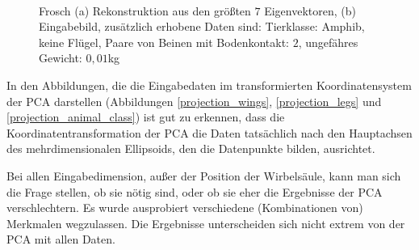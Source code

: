 \begin{figure}
  \centering
  \\
  
  \caption{Frosch (a) Rekonstruktion aus den größten $7$ Eigenvektoren, (b) Eingabebild, zusätzlich erhobene Daten sind:
  Tierklasse: Amphib, keine Flügel, Paare von Beinen mit Bodenkontakt: $2$, ungefähres Gewicht: $0,01$kg}
  \label{frosch}
 \end{figure}
 

 In den Abbildungen, die die Eingabedaten im transformierten Koordinatensystem der PCA darstellen (Abbildungen \ref{projection_wings}, \ref{projection_legs} und \ref{projection_animal_class}) ist gut zu erkennen, dass die Koordinatentransformation der PCA die Daten tatsächlich nach den Hauptachsen des mehrdimensionalen Ellipsoids, den die Datenpunkte bilden, ausrichtet.

 Bei allen Eingabedimension, außer der Position der Wirbelsäule, kann man sich die Frage stellen, ob sie nötig sind, oder ob sie eher die Ergebnisse der PCA verschlechtern. Es wurde ausprobiert verschiedene (Kombinationen von) Merkmalen wegzulassen. Die Ergebnisse unterscheiden sich nicht extrem von der PCA mit allen Daten. 
 
